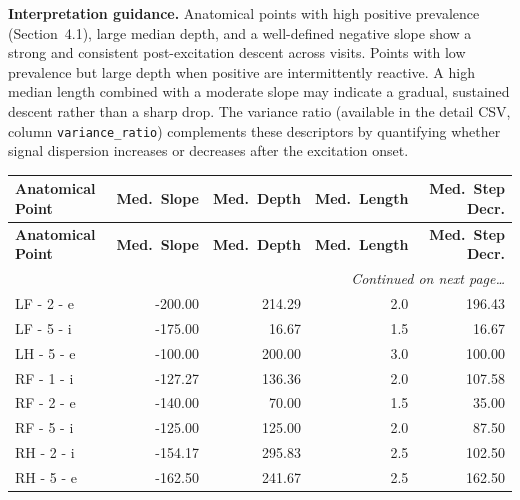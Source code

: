\documentclass[a4paper,11pt]{article}
\begin{document}
\medskip
\noindent\textbf{Interpretation guidance.}
Anatomical points with high positive prevalence (Section~4.1), large median depth, and a
well-defined negative slope show a strong and consistent post-excitation descent across
visits.
Points with low prevalence but large depth when positive are intermittently reactive.
A high median length combined with a moderate slope may indicate a gradual, sustained
descent rather than a sharp drop.
The variance ratio (available in the detail CSV, column \texttt{variance\_ratio}) complements
these descriptors by quantifying whether signal dispersion increases or decreases after the
excitation onset.

\begin{small}
\begin{longtable}{p{4.5cm}rrrr}
\toprule
\textbf{Anatomical Point} &
\textbf{Med.\ Slope} &
\textbf{Med.\ Depth} &
\textbf{Med.\ Length} &
\textbf{Med.\ Step Decr.} \\
\midrule
\endfirsthead
\toprule
\textbf{Anatomical Point} &
\textbf{Med.\ Slope} &
\textbf{Med.\ Depth} &
\textbf{Med.\ Length} &
\textbf{Med.\ Step Decr.} \\
\midrule
\endhead
\midrule
\multicolumn{5}{r}{\small\emph{Continued on next page\ldots}} \\
\endfoot
\bottomrule
\endlastfoot
LF - 2 - e & -200.00 & 214.29 & 2.0 & 196.43 \\
LF - 5 - i & -175.00 & 16.67 & 1.5 & 16.67 \\
LH - 5 - e & -100.00 & 200.00 & 3.0 & 100.00 \\
RF - 1 - i & -127.27 & 136.36 & 2.0 & 107.58 \\
RF - 2 - e & -140.00 & 70.00 & 1.5 & 35.00 \\
RF - 5 - i & -125.00 & 125.00 & 2.0 & 87.50 \\
RH - 2 - i & -154.17 & 295.83 & 2.5 & 102.50 \\
RH - 5 - e & -162.50 & 241.67 & 2.5 & 162.50 \\
\end{longtable}
\end{small}
\end{document}
